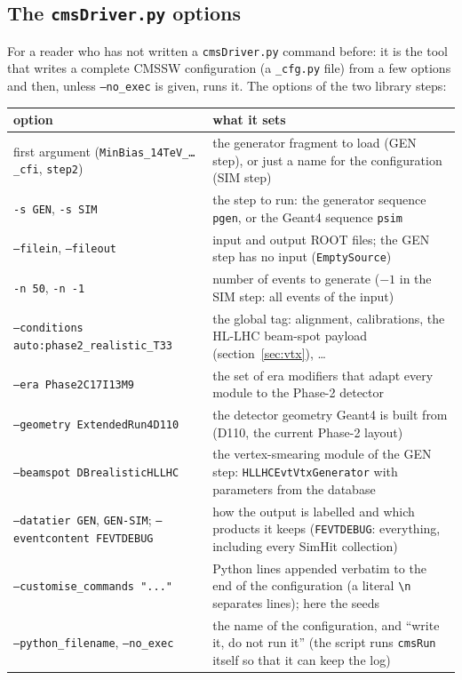 \documentclass[11pt,a4paper]{article}
\newcommand{\code}[1]{\texttt{#1}}
\begin{document}
\subsection{The \code{cmsDriver.py} options}

For a reader who has not written a \code{cmsDriver.py} command before: it is the tool that writes a
complete CMSSW configuration (a \code{\_cfg.py} file) from a few options and then, unless \code{--no\_exec}
is given, runs it. The options of the two library steps:
\begin{center}\small
\begin{tabularx}{\textwidth}{>{\raggedright\arraybackslash}p{54mm}X}
\toprule
option & what it sets \\
\midrule
first argument (\code{MinBias\_14TeV\_\ldots\_cfi}, \code{step2}) & the generator fragment to load (GEN step),
  or just a name for the configuration (SIM step) \\
\code{-s GEN}, \code{-s SIM} & the step to run: the generator sequence \code{pgen}, or the Geant4 sequence
  \code{psim} \\
\code{--filein}, \code{--fileout} & input and output ROOT files; the GEN step has no input
  (\code{EmptySource}) \\
\code{-n 50}, \code{-n -1} & number of events to generate ($-1$ in the SIM step: all events of the input) \\
\code{--conditions auto:phase2\_realistic\_T33} & the global tag: alignment, calibrations, the HL-LHC beam-spot
  payload (section~\ref{sec:vtx}), \ldots \\
\code{--era Phase2C17I13M9} & the set of era modifiers that adapt every module to the Phase-2 detector \\
\code{--geometry ExtendedRun4D110} & the detector geometry Geant4 is built from (D110, the current Phase-2
  layout) \\
\code{--beamspot DBrealisticHLLHC} & the vertex-smearing module of the GEN step: \code{HLLHCEvtVtxGenerator}
  with parameters from the database \\
\code{--datatier GEN}, \code{GEN-SIM}; \code{--eventcontent FEVTDEBUG} & how the output is labelled and which
  products it keeps (\code{FEVTDEBUG}: everything, including every SimHit collection) \\
\code{--customise\_commands "..."} & Python lines appended verbatim to the end of the configuration (a literal
  \code{\textbackslash n} separates lines); here the seeds \\
\code{--python\_filename}, \code{--no\_exec} & the name of the configuration, and ``write it, do not run it''
  (the script runs \code{cmsRun} itself so that it can keep the log) \\
\bottomrule
\end{tabularx}
\end{center}
\end{document}
